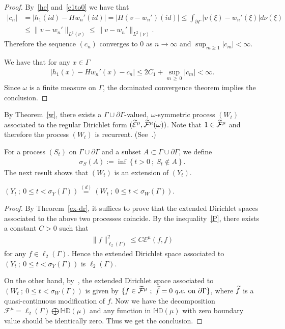 \documentclass[AHL,Unicode,longabstracts,published]{cedram}
\newcommand{\ce}{\mathcal{E}}
\newcommand{\cf}{\mathcal{F}}
\newcommand{\bHD}{\mathbb{HD}}
\let\oldtilde\tilde
\renewcommand*{\tilde}[1]{\mathchoice{\widetilde{#1}}{\widetilde{#1}}{\oldtilde{#1}}{\oldtilde{#1}}}
\begin{document}
\begin{proof}
By~\eqref{he} and~\eqref{e1to0} we have that
\begin{align*}
|c_n|&=|h_1(id)-Hw_n'(id)|=|H(v-w_n')(id)|\leq \int_{\partial\Gamma} |v(\xi)-w_n'(\xi)|d\nu(\xi)\\
&\leq
\|v-w_n'\|_{L^1(\nu)}\leq
\|v-w_n'\|_{L^2(\nu)}.
\end{align*}
Therefore the sequence $(c_n)$ converges to $0$ as $n\to\infty$ and $\sup_{m\geq1}|c_m|<\infty$.



We have that for any $x\in\Gamma$
\begin{align*}
\left|h_1(x)-Hw_n'(x)-c_n\right|\leq 2C_1+\sup_{m\,\geq\,0}|c_m|<\infty.
\end{align*}
Since $\omega$ is a finite measure on $\Gamma$, the dominated convergence theorem implies the conclusion.
\end{proof}

By Theorem~\ref{w}, there exists a $\Gamma\cup\partial\Gamma$-valued, $\omega$-symmetric process $(W_t)$ associated to the regular Dirichlet form $(\tilde\ce^{\mu}, \tilde\cf^{\mu}(\omega))$. Note that $1\in\tilde\cf^{\mu}$ and therefore the process $(W_t)$ is recurrent. (See~\cite[Theorem~1.6.3]{FOT}.)



For a process $(S_t)$ on $\Gamma\cup\partial\Gamma$ and a subset $A\subset\Gamma\cup\partial\Gamma$, we define
\begin{align*}
\sigma_S(A):=\inf\left\{t>0\ ;\ S_t\notin A\right\}.
\end{align*}
The next result shows that $(W_t)$ is an extension of $(Y_t)$.

\begin{prop}\label{tau}
$(Y_t\ ;\ 0\leq t<\sigma_Y(\Gamma))\overset{(d)}{=}(W_t\ ;\ 0\leq t<\sigma_W(\Gamma)).$
\end{prop}

\begin{proof}
By Theorem~\ref{ex-dr}, it suffices to prove that the extended Dirichlet spaces associated to the above two processes coincide.
By the inequality~\eqref{P}, there exists a constant $C>0$ such that
\begin{align*}
\|f\|_{\ell_2(\Gamma)}^2\leq C\ce^{\mu}(f,f)
\end{align*}
for any $f\in\ell_2(\Gamma)$. Hence the extended Dirichlet space associated to $(Y_t\ ;\ 0\leq t<\sigma_Y(\Gamma))$ is $\ell_2(\Gamma)$.

On the other hand, by~\cite[Theorem~3.4.9]{CF}, the extended Dirichlet space associated to $(W_t\ ;\ 0\leq t<\sigma_W(\Gamma))$ is given by $\{f\in\tilde\cf^{\mu}\ ;\ \tilde{f}=0\ q.e.\ \text{on}\ \partial\Gamma\}$, where $\tilde{f}$ is a quasi-continuous modification of $f$. Now we have the decomposition $\cf^{\mu}=\ell_2(\Gamma)\bigoplus\bHD(\mu)$ and any function in $\bHD(\mu)$ with zero boundary value should be identically zero. Thus we get the conclusion.
\end{proof}
\end{document}
